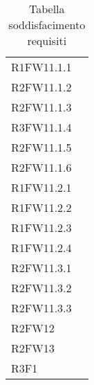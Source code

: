 \begin{table}[!htbp]
\begin{tabular}[t]{ m{}<{\centering}  m{}<{\centering} }
	R1FW11.1.1 & \So \\
		
	R2FW11.1.2 & \So \\
		
	R2FW11.1.3 & \So \\
	
	R3FW11.1.4& \Ns \\
	
	R2FW11.1.5& \Ns \\
	
	R2FW11.1.6 & \So \\
	
	R1FW11.2.1 & \So \\

	R1FW11.2.2 & \So \\	
	
	R1FW11.2.3 & \So \\
	
	R1FW11.2.4 & \So \\
	
	R2FW11.3.1 & \So \\
	
	R2FW11.3.2 & \So \\
	
	R2FW11.3.3 & \So \\

	R2FW12& \Ns \\

	R2FW13 & \Ns \\

	R3F1 & \Ns \\


\end{tabular}
\caption{Tabella soddisfacimento requisiti}
\end{table}